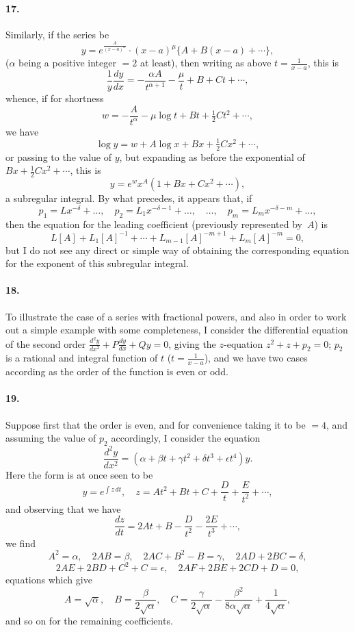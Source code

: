 \documentclass[11pt,a4paper]{book}
\begin{document}
\paragraph{17.} Similarly, if the series be
\[
y = e^{\frac{A}{(x-a)^{\alpha}}} \cdot (x-a)^{\mu}\{A + B(x-a) + \cdots\},
\]
($\alpha$ being a positive integer $= 2$ at least), then writing as above $t = \frac{1}{x-a}$, this is
\[
\frac{1}{y}\frac{dy}{dx} = -\frac{\alpha A}{t^{\alpha+1}} - \frac{\mu}{t} + B + Ct + \cdots,
\]
whence, if for shortness
\[
w = -\frac{A}{t^{\alpha}} - \mu\log t + Bt + \tfrac{1}{2}Ct^{2} + \cdots,
\]
we have
\[
\log y = w + A\log x + Bx + \tfrac{1}{2}Cx^{2} + \cdots,
\]
or passing to the value of $y$, but expanding as before the exponential of $Bx + \tfrac{1}{2}Cx^{2} + \cdots$, this is
\[
y = e^{w}x^{A}(1 + Bx + Cx^{2} + \cdots),
\]
a subregular integral. By what precedes, it appears that, if
\[
p_{1} = Lx^{-\delta} + \ldots, \quad p_{2} = L_{1}x^{-\delta-1} + \ldots, \quad \ldots, \quad p_{m} = L_{m}x^{-\delta-m} + \ldots,
\]
then the equation for the leading coefficient (previously represented by~$A$) is
\[
L[A] + L_{1}[A]^{-1} + \cdots + L_{m-1}[A]^{-m+1} + L_{m}[A]^{-m} = 0,
\]
but I do not see any direct or simple way of obtaining the corresponding equation for the exponent of this subregular integral.

\paragraph{18.} To illustrate the case of a series with fractional powers, and also in order to work out a simple example with some completeness, I consider the differential equation of the second order $\frac{d^{2}y}{dx^{2}} + P\frac{dy}{dx} + Qy = 0$, giving the $z$-equation $z^{2} + z + p_{2} = 0$; $p_{2}$ is a rational and integral function of $t$ ($t = \frac{1}{x-a}$), and we have two cases according as the order of the function is even or odd.

\paragraph{19.} Suppose first that the order is even, and for convenience taking it to be $= 4$, and assuming the value of $p_{2}$ accordingly, I consider the equation
\[
\frac{d^{2}y}{dx^{2}} = (\alpha + \beta t + \gamma t^{2} + \delta t^{3} + \epsilon t^{4})y.
\]
Here the form is at once seen to be
\[
y = e^{\int z\,dt}, \quad z = At^{2} + Bt + C + \frac{D}{t} + \frac{E}{t^{2}} + \cdots,
\]
and observing that we have
\[
\frac{dz}{dt} = 2At + B - \frac{D}{t^{2}} - \frac{2E}{t^{3}} + \cdots,
\]
we find
\[
A^{2} = \alpha, \quad 2AB = \beta, \quad 2AC + B^{2} - B = \gamma, \quad 2AD + 2BC = \delta,
\]
\[
2AE + 2BD + C^{2} + C = \epsilon, \quad 2AF + 2BE + 2CD + D = 0,
\]
equations which give
\[
A = \sqrt{\alpha}, \quad B = \frac{\beta}{2\sqrt{\alpha}}, \quad C = \frac{\gamma}{2\sqrt{\alpha}} - \frac{\beta^{2}}{8\alpha\sqrt{\alpha}} + \frac{1}{4\sqrt{\alpha}},
\]
and so on for the remaining coefficients.
\clearpage
\end{document}
